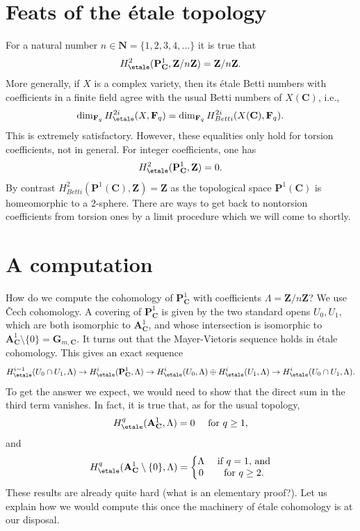 \section{Feats of the \'etale topology}
\label{section-feats}

\noindent
For a natural number $n \in \mathbf{N} = \{1, 2, 3, 4, \ldots\}$ it is true that
$$
H_\etale^2 (\mathbf{P}^1_\mathbf{C}, \mathbf{Z}/n\mathbf{Z}) =
\mathbf{Z}/n\mathbf{Z}.
$$
More generally, if $X$ is a complex variety, then its \'etale Betti numbers
with coefficients in a finite field agree with the usual Betti numbers of
$X(\mathbf{C})$, i.e.,
$$
\dim_{\mathbf{F}_q} H_\etale^{2i} (X, \mathbf{F}_q) =
\dim_{\mathbf{F}_q} H_{Betti}^{2i} (X(\mathbf{C}), \mathbf{F}_q).
$$
This is extremely satisfactory. However, these equalities only hold for torsion
coefficients, not in general. For integer coefficients, one has
$$
H_\etale^2 (\mathbf{P}^1_\mathbf{C}, \mathbf{Z}) = 0.
$$
By contrast $H_{Betti}^2(\mathbf{P}^1(\mathbf{C}), \mathbf{Z}) = \mathbf{Z}$
as the topological space $\mathbf{P}^1(\mathbf{C})$ is homeomorphic to
a $2$-sphere.
There are ways to get back to nontorsion coefficients from torsion ones by a
limit procedure which we will come to shortly.




\section{A computation}
\label{section-computation}

\noindent
How do we compute the cohomology of $\mathbf{P}^1_\mathbf{C}$ with coefficients
$\Lambda = \mathbf{Z}/n\mathbf{Z}$?
We use {\v C}ech cohomology. A covering of $\mathbf{P}^1_\mathbf{C}$ is given
by the two standard opens $U_0, U_1$, which are both
isomorphic to $\mathbf{A}^1_\mathbf{C}$, and whose intersection is isomorphic
to $\mathbf{A}^1_\mathbf{C} \setminus \{0\} = \mathbf{G}_{m, \mathbf{C}}$.
It turns out that the Mayer-Vietoris sequence holds in \'etale cohomology.
This gives an exact sequence
$$
H_\etale^{i-1}(U_0\cap U_1, \Lambda) \to
H_\etale^i(\mathbf{P}^1_\mathbf{C}, \Lambda) \to
H_\etale^i(U_0, \Lambda) \oplus
H_\etale^i(U_1, \Lambda) \to H_\etale^i(U_0\cap U_1,
\Lambda).
$$
To get the answer we expect, we would need to show that the direct sum in the
third term vanishes. In fact, it is true that, as for the usual topology,
$$
H_\etale^q (\mathbf{A}^1_\mathbf{C}, \Lambda) = 0
\quad \text{ for } q \geq 1,
$$
and
$$
H_\etale^q (\mathbf{A}^1_\mathbf{C} \setminus \{0\}, \Lambda) = \left\{
\begin{matrix}
\Lambda & \text{ if }q = 1\text{, and} \\
0 & \text{ for }q \geq 2.
\end{matrix}
\right.
$$
These results are already quite hard (what is an elementary proof?). Let us
explain how we would compute this once the machinery of \'etale cohomology is
at our disposal.


